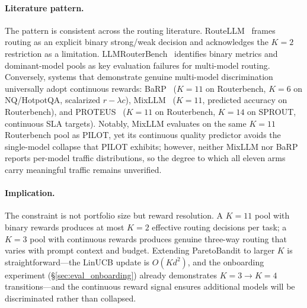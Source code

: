 \paragraph{Literature pattern.}
The pattern is consistent across the routing literature.  RouteLLM~\cite{ong2024routellm} frames routing as an explicit binary strong/weak decision and acknowledges the $K{=}2$ restriction as a limitation.  LLMRouterBench~\cite{li2026llmrouterbench} identifies binary metrics and dominant-model pools as key evaluation failures for multi-model routing.  Conversely, systems that demonstrate genuine multi-model discrimination universally adopt continuous rewards: BaRP~\cite{wang2025barp} ($K{=}11$ on Routerbench, $K{=}6$ on NQ/HotpotQA, scalarized $r - \lambda c$), MixLLM~\cite{wang2025mixllm} ($K{=}11$, predicted accuracy on Routerbench), and PROTEUS~\cite{bhatti2026proteus} ($K{=}11$ on Routerbench, $K{=}14$ on SPROUT, continuous SLA targets).  Notably, MixLLM evaluates on the same $K{=}11$ Routerbench pool as PILOT, yet its continuous quality predictor avoids the single-model collapse that PILOT exhibits; however, neither MixLLM nor BaRP reports per-model traffic distributions, so the degree to which all eleven arms carry meaningful traffic remains unverified.

\paragraph{Implication.}
The constraint is not portfolio size but reward resolution.  A $K{=}11$ pool with binary rewards produces at most $K{=}2$ effective routing decisions per task; a $K{=}3$ pool with continuous rewards produces genuine three-way routing that varies with prompt context and budget.  Extending ParetoBandit to larger $K$ is straightforward---the LinUCB update is $O(Kd^2)$, and the onboarding experiment (\S\ref{sec:eval_onboarding}) already demonstrates $K{=}3 \to K{=}4$ transitions---and the continuous reward signal ensures additional models will be discriminated rather than collapsed.
